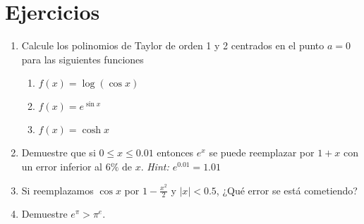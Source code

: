 \documentclass[12pt]{book}
\providecommand{\abs}[1]{\lvert#1\rvert}
\begin{document}
\section{Ejercicios}
\begin{enumerate}
    \item Calcule los polinomios de Taylor de orden 1 y 2 centrados en el punto $a=0$ para las siguientes funciones
    \begin{enumerate}
        \item $f(x)=\log(\cos{x})$
        \item $f(x)=e^{\sin{x}}$
        \item $f(x)=\cosh{x}$
    \end{enumerate}
    \item Demuestre que si $0 \le x \le 0.01$ entonces $e^x$ se puede reemplazar por $1+x$ con un error inferior al $6\% \mbox{ de }x$. \textit{Hint: $e^{0.01}=1.01$}
    \item Si reemplazamos $\cos{x}$ por $1-\frac{x^2}{2}$ y $\abs{x}<0.5$, ¿Qué error se está cometiendo?
    \item Demuestre $e^{\pi}>\pi^e$.
\end{enumerate}
\end{document}

